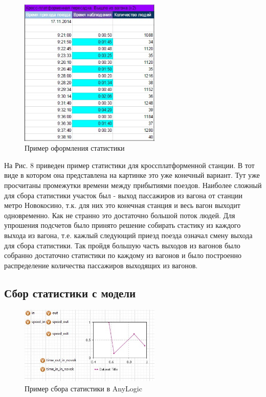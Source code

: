 \documentclass[12pt]{article}
\begin{document}
 \begin{figure}
  	\begin{center}
  	  	\includegraphics[width=0.6\textwidth]{stat_example.jpg}
 	 \end{center}
	  	\caption{Пример оформления статистики}
\end{figure}
На Рис. 8 приведен пример статистики для кроссплатформенной станции. В тот виде в котором она представлена на картинке это уже конечный вариант. Тут уже просчитаны промежутки времени между прибытиями поездов.		 
		   Наиболее сложный для сбора статистики участок был - выход пассажиров из вагона от станции метро Новокосино, т.к. для них это конечная станция и весь вагон выходит одновременно. Как не странно это достаточно большой поток людей. Для упрошения подсчетов было принято решение собирать стастику из каждого выхода из вагона, т.е. кажлый следующий приезд поезда означал смену выхода для сбора статистики.  Так пройдя большую часть выходов из вагонов было собранно достаточно статистики по каждому из вагонов и было построенно распределение количества пассажиров выходящих из вагонов. 
		\subsection{Сбор статистики с модели}
		
 \begin{figure}
  	\begin{center}
  	  	\includegraphics[width=0.6\textwidth]{stat_any_logic.jpg}
 	 \end{center}
	  	\caption{Пример сбора статистики в AnyLogic}
\end{figure}		
		
\end{document}
